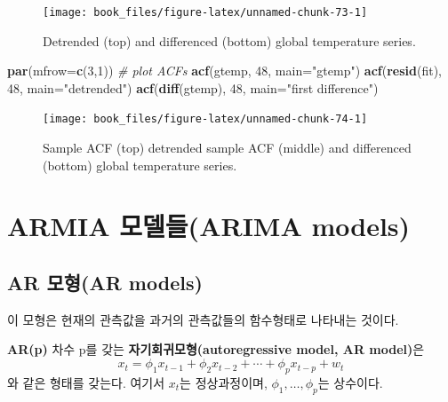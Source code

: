 \documentclass[b5paper,]{scrbook}
\makeatletter
\newenvironment{Shaded}{\begin{snugshade}}{\end{snugshade}}
\newcommand{\KeywordTok}[1]{\textcolor[rgb]{0.13,0.29,0.53}{\textbf{{#1}}}}
\newcommand{\DataTypeTok}[1]{\textcolor[rgb]{0.13,0.29,0.53}{{#1}}}
\newcommand{\DecValTok}[1]{\textcolor[rgb]{0.00,0.00,0.81}{{#1}}}
\newcommand{\StringTok}[1]{\textcolor[rgb]{0.31,0.60,0.02}{{#1}}}
\newcommand{\CommentTok}[1]{\textcolor[rgb]{0.56,0.35,0.01}{\textit{{#1}}}}
\newcommand{\NormalTok}[1]{{#1}}
\theoremstyle{plain}
\theoremstyle{definition}
\numberwithin{equation}{section}
\newenvironment{kframe}{%
\medskip{}
\setlength{\fboxsep}{.8em}
 \def\at@end@of@kframe{}%
 \ifinner\ifhmode%
  \def\at@end@of@kframe{\end{minipage}}%
  \begin{minipage}{\columnwidth}%
 \fi\fi%
 \def\FrameCommand##1{\hskip\@totalleftmargin \hskip-\fboxsep
 \colorbox{shadecolor}{##1}\hskip-\fboxsep
     \hskip-\linewidth \hskip-\@totalleftmargin \hskip\columnwidth}%
 \MakeFramed {\advance\hsize-\width
   \@totalleftmargin\z@ \linewidth\hsize
   \@setminipage}}%
 {\par\unskip\endMakeFramed%
 \at@end@of@kframe}
\renewenvironment{Shaded}{\begin{kframe}}{\end{kframe}}
\let\BeginKnitrBlock\begin \let\EndKnitrBlock\end
\makeatother
\begin{document}
\begin{figure}

{\centering \texttt{[image: book\_files/figure-latex/unnamed-chunk-73-1]} 

}

\caption{Detrended (top) and differenced (bottom) global temperature series.}\label{fig:unnamed-chunk-73}
\end{figure}

\begin{Shaded}
\begin{Highlighting}[]
\KeywordTok{par}\NormalTok{(}\DataTypeTok{mfrow=}\KeywordTok{c}\NormalTok{(}\DecValTok{3}\NormalTok{,}\DecValTok{1}\NormalTok{)) }\CommentTok{# plot ACFs}
\KeywordTok{acf}\NormalTok{(gtemp, }\DecValTok{48}\NormalTok{, }\DataTypeTok{main=}\StringTok{"gtemp"}\NormalTok{)}
\KeywordTok{acf}\NormalTok{(}\KeywordTok{resid}\NormalTok{(fit), }\DecValTok{48}\NormalTok{, }\DataTypeTok{main=}\StringTok{"detrended"}\NormalTok{)}
\KeywordTok{acf}\NormalTok{(}\KeywordTok{diff}\NormalTok{(gtemp), }\DecValTok{48}\NormalTok{, }\DataTypeTok{main=}\StringTok{"first difference"}\NormalTok{)}
\end{Highlighting}
\end{Shaded}

\begin{figure}

{\centering \texttt{[image: book\_files/figure-latex/unnamed-chunk-74-1]} 

}

\caption{Sample ACF (top) detrended sample ACF (middle) and differenced (bottom) global temperature series.}\label{fig:unnamed-chunk-74}
\end{figure}

\section{ARMIA 모델들(ARIMA models)}\label{armia-arima-models}

\subsection{AR 모형(AR models)}\label{ar-ar-models}

이 모형은 현재의 관측값을 과거의 관측값들의 함수형태로 나타내는 것이다.

\BeginKnitrBlock{definition}[자기회귀모형]
\protect\hypertarget{def:unnamed-chunk-75}{}{\label{def:unnamed-chunk-75}
{} }\textbf{AR(p)} 차수 p를 갖는
\textbf{자기회귀모형(autoregressive model, AR model)}은
\[x_{t}=\phi_{1}x_{t-1}+\phi_{2}x_{t-2} + \cdots + \phi_{p}x_{t-p}+w_{t}\]
와 같은 형태를 갖는다. 여기서 \(x_{t}\)는 정상과정이며,
\(\phi_{1},\ldots , \phi_{p}\)는 상수이다.
\EndKnitrBlock{definition}
\end{document}
